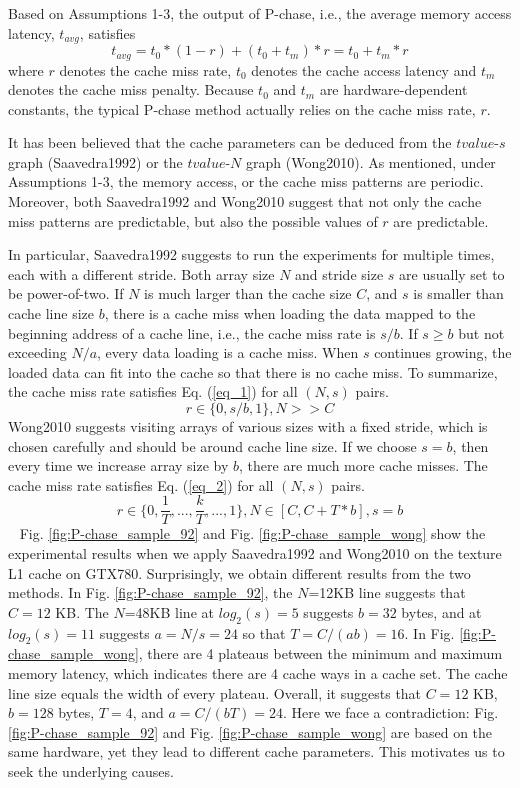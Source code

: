 \documentclass[10pt,journal,compsoc]{IEEEtran}
\theoremstyle{definition}
\begin{document}
Based on Assumptions 1-3, the output of P-chase, i.e., the average memory access latency, $t_{avg}$, satisfies
\[t_{avg}=t_0*(1-r)+(t_0+t_m)*r=t_0+t_m*r\]
where $r$ denotes the cache miss rate, $t_0$ denotes the cache access latency and $t_m$ denotes the cache miss penalty. Because $t_0$ and $t_m$ are hardware-dependent constants, the typical P-chase method actually relies on the cache miss rate, $r$.

It has been believed that the cache parameters can be deduced from the $tvalue$-$s$ graph (Saavedra1992) or the $tvalue$-$N$ graph (Wong2010). As mentioned, under Assumptions 1-3, the memory access, or the cache miss patterns are periodic. Moreover, both Saavedra1992 and Wong2010 suggest that not only the cache miss patterns are predictable, but also the possible values of $r$ are predictable.

In particular, Saavedra1992 suggests to run the experiments for multiple times, each with a different stride. Both array size $N$ and stride size $s$ are usually set to be power-of-two. If $N$ is much larger than the cache size $C$, and $s$ is smaller than cache line size $b$, there is a cache miss when loading the data mapped to the beginning address of a cache line, i.e., the cache miss rate is $s/b$. If $s\ge b$ but not exceeding $N/a$, every data loading is a cache miss. When $s$ continues growing, the loaded data can fit into the cache so that there is no cache miss. To summarize, the cache miss rate satisfies Eq. (\ref{eq_1}) for all $(N, s)$ pairs.
\begin{equation}
r \in \{0, s/b, 1\}, N>>C \label{eq_1}
\end{equation}
Wong2010 suggests visiting arrays of various sizes with a fixed stride, which is chosen carefully and should be around cache line size. If we choose $s=b$, then every time we increase array size by $b$, there are much more cache misses. The cache miss rate satisfies Eq. (\ref{eq_2}) for all $(N, s)$ pairs.
\begin{equation}
r \in \{0, \frac{1}{T}, ..., \frac{k}{T},..., 1\}, N \in [C, C+T*b], s=b \label{eq_2}
\end{equation}
~
Fig. \ref{fig:P-chase_sample_92} and Fig. \ref{fig:P-chase_sample_wong} show the experimental results when we apply Saavedra1992 and Wong2010 on the texture L1 cache on GTX780. Surprisingly, we obtain different results from the two methods. In Fig. \ref{fig:P-chase_sample_92}, the $N$=12KB line suggests that $C=12$ KB. The $N$=48KB line at $log_2(s)=5$ suggests $b=32$ bytes, and at $log_2(s)=11$ suggests $a=N/s=24$ so that $T=C/(ab)=16$. In Fig. \ref{fig:P-chase_sample_wong}, there are 4 plateaus between the minimum and maximum memory latency, which indicates there are 4 cache ways in a cache set. The cache line size equals the width of every plateau. Overall, it suggests that $C=12$ KB, $b=128$ bytes, $T=4$, and $a=C/(bT)=24$. Here we face a contradiction: Fig. \ref{fig:P-chase_sample_92} and Fig. \ref{fig:P-chase_sample_wong} are based on the same hardware, yet they lead to different cache parameters. This motivates us to seek the underlying causes.
\end{document}
